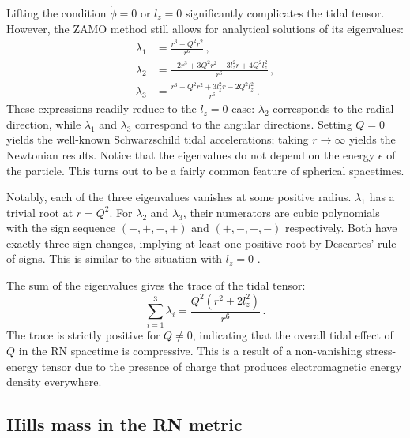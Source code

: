 \documentclass[
    reprint,
    prd,
    nofootinbib,
    amsmath,amssymb,
    aps,
    floatfix,
]{revtex4-2}
\begin{document}
Lifting the condition $\dot{\phi} = 0$ or $l_{z} = 0$ significantly complicates the tidal tensor. However, the ZAMO method still allows for analytical solutions of its eigenvalues:
\begin{equation}
    \begin{split}
        \lambda_{1} &= \frac{r^{3} - Q^{2} r^{2}}{r^{6}} \, , \\
        \lambda_{2} &= \frac{-2r^{3} + 3Q^{2} r^{2} - 3l_{z}^{2} r + 4Q^{2}l_{z}^{2}}{r^{6}} \, , \\
        \lambda_{3} &= \frac{r^{3} - Q^{2} r^{2} + 3l_{z}^{2} r - 2Q^{2}l_{z}^{2}}{r^{6}} \, .
    \end{split}
    \label{eq:rn_eigenvalues}
\end{equation}
These expressions readily reduce to the $l_{z} = 0$ case: $\lambda_{2}$ corresponds to the radial direction, while $\lambda_{1}$ and $\lambda_{3}$ correspond to the angular directions. Setting $Q = 0$ yields the well-known Schwarzschild tidal accelerations; taking $r \to \infty$ yields the Newtonian results. Notice that the eigenvalues do not depend on the energy $\epsilon$ of the particle. This turns out to be a fairly common feature of spherical spacetimes.

Notably, each of the three eigenvalues vanishes at some positive radius. $\lambda_{1}$ has a trivial root at $r=Q^{2}$. For $\lambda_{2}$ and $\lambda_{3}$, their numerators are cubic polynomials with the sign sequence $(-, +, -, +)$ and $(+, -, +, -)$ respectively. Both have exactly three sign changes, implying at least one positive root by Descartes' rule of signs. This is similar to the situation with $l_{z} = 0$ \cite{Crispino2016}.

The sum of the eigenvalues gives the trace of the tidal tensor:
\begin{equation}
    \sum_{i=1}^{3} \lambda_{i} = \frac{Q^{2}(r^{2} + 2l_{z}^{2})}{r^{6}} \, .
    \label{eq:rn_trace}
\end{equation}
The trace is strictly positive for $Q \neq 0$, indicating that the overall tidal effect of $Q$ in the RN spacetime is compressive. This is a result of a non-vanishing stress-energy tensor due to the presence of charge that produces electromagnetic energy density everywhere.


\subsection{Hills mass in the RN metric}
\end{document}
